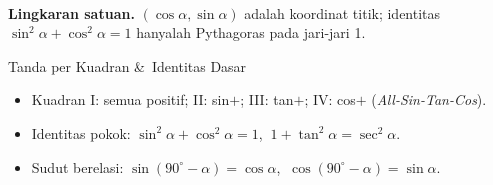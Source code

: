 \documentclass[11pt,a4paper]{report}
\theoremstyle{gaya}
\begin{document}
\begin{center}
\\
\small \textbf{Lingkaran satuan.} $(\cos\alpha,\sin\alpha)$ adalah koordinat titik; identitas $\sin^2\alpha+\cos^2\alpha=1$ hanyalah Pythagoras pada jari-jari 1.
\end{center}

\begin{konsep}{Tanda per Kuadran \&\ Identitas Dasar}
\begin{itemize}[leftmargin=*,topsep=2pt]
  \item Kuadran I: semua positif; II: sin$+$; III: tan$+$; IV: cos$+$ (\emph{All-Sin-Tan-Cos}).
  \item Identitas pokok: $\sin^2\alpha+\cos^2\alpha=1$, $\ 1+\tan^2\alpha=\sec^2\alpha$.
  \item Sudut berelasi: $\sin(90^\circ-\alpha)=\cos\alpha$, $\ \cos(90^\circ-\alpha)=\sin\alpha$.
\end{itemize}
\end{konsep}
\end{document}
